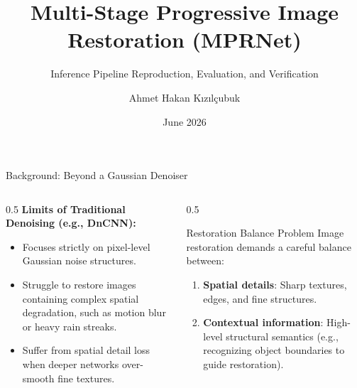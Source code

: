 \documentclass[aspectratio=169]{beamer}
\title[MPRNet Inference Reproduction]{\textbf{Multi-Stage Progressive Image Restoration (MPRNet)}}
\subtitle{Inference Pipeline Reproduction, Evaluation, and Verification}
\author[A. Hakan]{Ahmet Hakan Kızılçubuk}
\institute{Artificial Intelligence and Cybersecurity}
\date{June 2026}
\begin{document}
\begin{frame}[plain]
    \titlepage
\end{frame}

\begin{frame}{Background: Beyond a Gaussian Denoiser}
    \begin{columns}
        \begin{column}{0.5\textwidth}
            \textbf{Limits of Traditional Denoising (e.g., DnCNN):}
            \begin{itemize}
                \item Focuses strictly on pixel-level Gaussian noise structures.
                \item Struggle to restore images containing complex spatial degradation, such as motion blur or heavy rain streaks.
                \item Suffer from spatial detail loss when deeper networks over-smooth fine textures.
            \end{itemize}
        \end{column}
        \begin{column}{0.5\textwidth}
            \begin{block}{Restoration Balance Problem}
                Image restoration demands a careful balance between:
                \begin{enumerate}
                    \item \textbf{Spatial details}: Sharp textures, edges, and fine structures.
                    \item \textbf{Contextual information}: High-level structural semantics (e.g., recognizing object boundaries to guide restoration).
                \end{enumerate}
            \end{block}
        \end{column}
    \end{columns}
\end{frame}
\end{document}
